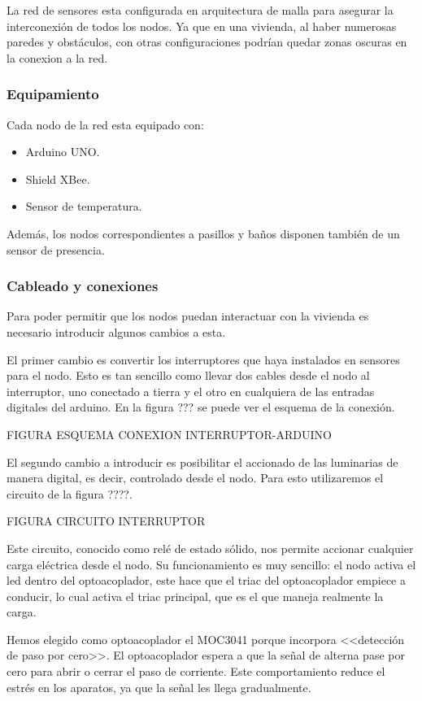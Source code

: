 La red de sensores esta configurada en arquitectura de  malla para asegurar la interconexión de todos los nodos. Ya que en una vivienda, al haber numerosas paredes y obstáculos, con otras configuraciones podrían quedar zonas oscuras en la conexion a la red.

\subsubsection{Equipamiento}
Cada nodo de la red esta equipado con:
\begin{itemize}
    \item Arduino UNO.
    \item Shield XBee.
    \item Sensor de temperatura.
\end{itemize}
Además, los nodos correspondientes a pasillos y baños disponen también de un sensor de presencia.

\subsubsection{Cableado y conexiones}
 Para poder permitir que los nodos puedan interactuar con la vivienda es necesario introducir algunos cambios a esta.
 
 El primer cambio es convertir los interruptores que haya instalados en sensores para el nodo. Esto es tan sencillo como llevar dos cables desde el nodo al interruptor, uno conectado a tierra y el otro en cualquiera de las entradas digitales del arduino. En la figura ??? se puede ver el esquema de la conexión.
 
 FIGURA ESQUEMA CONEXION INTERRUPTOR-ARDUINO
 
 
 El segundo cambio a introducir es posibilitar el accionado de las luminarias de manera digital, es decir, controlado desde el nodo. Para esto utilizaremos el circuito de la figura ????. 
 
 FIGURA CIRCUITO INTERRUPTOR
 
 Este circuito, conocido como relé de estado sólido, nos permite accionar cualquier carga eléctrica desde el nodo. Su funcionamiento es muy sencillo: el nodo activa el led dentro del optoacoplador, este hace que el triac del optoacoplador empiece a conducir, lo cual activa el triac principal, que es el que maneja realmente la carga. 
 
 Hemos elegido como optoacoplador el MOC3041 porque incorpora <<detección de paso por cero>>. El optoacoplador espera a que la señal de  alterna pase por cero para abrir o cerrar el paso de corriente. Este comportamiento reduce el estrés en los aparatos, ya que la señal les llega gradualmente.
  
